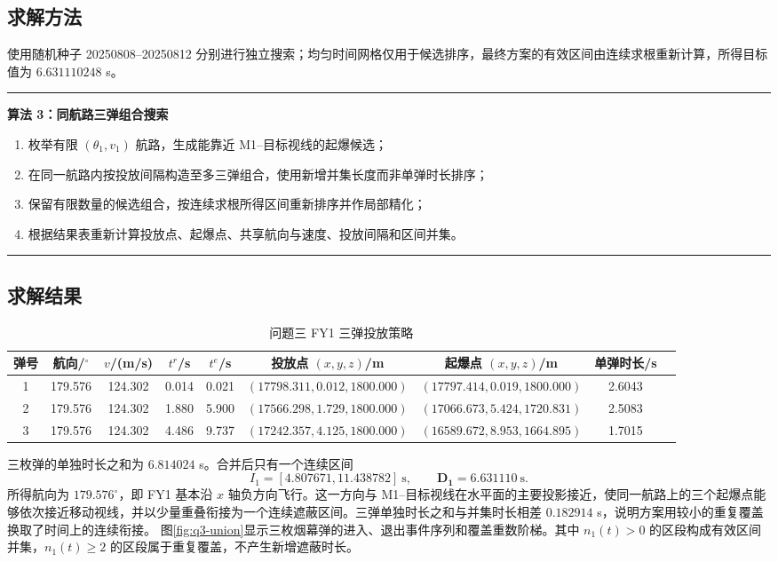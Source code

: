 \documentclass[UTF8,a4paper,12pt,fontset=windows]{ctexart}
\newcommand{\thead}[1]{{\bfseries\boldmath #1}}
\newenvironment{algobox}[1]
  {\par\medskip\noindent\begin{minipage}{\textwidth}\small\hrule\medskip\textbf{#1}\par\medskip}
  {\medskip\hrule\end{minipage}\par\medskip}
\begin{document}
\subsection{求解方法}

使用随机种子 20250808--20250812 分别进行独立搜索；均匀时间网格仅用于候选排序，最终方案的有效区间由连续求根重新计算，所得目标值为 $6.631110248$ s。

\begin{algobox}{算法 3：同航路三弹组合搜索}
\begin{enumerate}[label=\arabic*.,leftmargin=2em]
  \item 枚举有限 $(\theta_1,v_1)$ 航路，生成能靠近 M1--目标视线的起爆候选；
  \item 在同一航路内按投放间隔构造至多三弹组合，使用新增并集长度而非单弹时长排序；
  \item 保留有限数量的候选组合，按连续求根所得区间重新排序并作局部精化；
  \item 根据结果表重新计算投放点、起爆点、共享航向与速度、投放间隔和区间并集。
\end{enumerate}
\end{algobox}

\subsection{求解结果}

\begin{table}[!htbp]
\centering
\caption{问题三 FY1 三弹投放策略}
\label{tab:q3}
\scriptsize
\setlength{\tabcolsep}{3pt}
\begin{tabular}{ccccccccc}
\toprule
\thead{弹号} & \thead{航向/$^\circ$} & \thead{$v$/(m/s)} & \thead{$t^r$/s} & \thead{$t^e$/s} & \thead{投放点 $(x,y,z)$/m} & \thead{起爆点 $(x,y,z)$/m} & \thead{单弹时长/s}\\
\midrule
1 & 179.576 & 124.302 & 0.014 & 0.021 & $(17798.311,0.012,1800.000)$ & $(17797.414,0.019,1800.000)$ & 2.6043\\
2 & 179.576 & 124.302 & 1.880 & 5.900 & $(17566.298,1.729,1800.000)$ & $(17066.673,5.424,1720.831)$ & 2.5083\\
3 & 179.576 & 124.302 & 4.486 & 9.737 & $(17242.357,4.125,1800.000)$ & $(16589.672,8.953,1664.895)$ & 1.7015\\
\bottomrule
\end{tabular}
\end{table}

三枚弹的单独时长之和为 $6.814024$ s。合并后只有一个连续区间
\[
I_1=[4.807671,11.438782]\ \text{s},\qquad \bm{D_1=6.631110\ \mathrm{s}}.
\]
所得航向为 $179.576^\circ$，即 FY1 基本沿 $x$ 轴负方向飞行。这一方向与 M1--目标视线在水平面的主要投影接近，使同一航路上的三个起爆点能够依次接近移动视线，并以少量重叠衔接为一个连续遮蔽区间。三弹单独时长之和与并集时长相差 $0.182914$ s，说明方案用较小的重复覆盖换取了时间上的连续衔接。
图\ref{fig:q3-union}显示三枚烟幕弹的进入、退出事件序列和覆盖重数阶梯。其中 $n_1(t)>0$ 的区段构成有效区间并集，$n_1(t)\geq2$ 的区段属于重复覆盖，不产生新增遮蔽时长。
\end{document}
